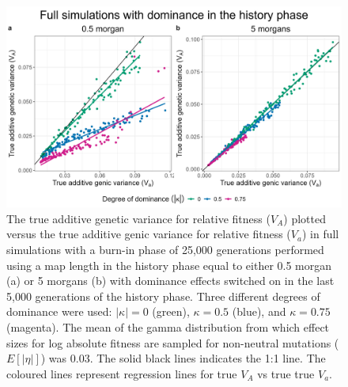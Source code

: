 \documentclass[12pt]{article}
\begin{document}
\begin{bibunit}
\newpage

\begin{figure}[H]
\centering
\includegraphics[scale = 0.15]{Figures/full_dominance_vA_va.jpg}
\caption{The true additive genetic variance for relative fitness ($V_A$) plotted versus the true additive genic variance for relative fitness ($V_a$) in full simulations with a burn-in phase of 25,000 generations performed using a map length in the history phase equal to either 0.5 morgan (a) or 5 morgans (b) with dominance effects switched on in the last 5,000 generations of the history phase. Three different degrees of dominance were used: $|\kappa| = 0$ (green), $\kappa = 0.5$ (blue), and $\kappa = 0.75$ (magenta). The mean of the gamma distribution from which effect sizes for log absolute fitness are sampled for non-neutral mutations ($E[|\eta|]$) was 0.03. The solid black lines indicates the 1:1 line. The coloured lines represent regression lines for true $V_A$ vs true true $V_a$. }
  \label{fig:full_dominance_vA_va}
\end{figure}


\end{bibunit}
\end{document}
